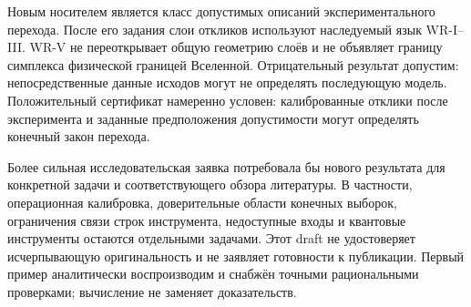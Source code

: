 {Новым носителем является класс допустимых описаний экспериментального перехода. После его задания слои откликов используют наследуемый язык WR-I--III. WR-V не переоткрывает общую геометрию слоёв и не объявляет границу симплекса физической границей Вселенной. Отрицательный результат допустим: непосредственные данные исходов могут не определять последующую модель. Положительный сертификат намеренно условен: калиброванные отклики после эксперимента и заданные предположения допустимости могут определять конечный закон перехода.}

{Более сильная исследовательская заявка потребовала бы нового результата для конкретной задачи и соответствующего обзора литературы. В частности, операционная калибровка, доверительные области конечных выборок, ограничения связи строк инструмента, недоступные входы и квантовые инструменты остаются отдельными задачами. Этот draft не удостоверяет исчерпывающую оригинальность и не заявляет готовности к публикации. Первый пример аналитически воспроизводим и снабжён точными рациональными проверками; вычисление не заменяет доказательств.}

